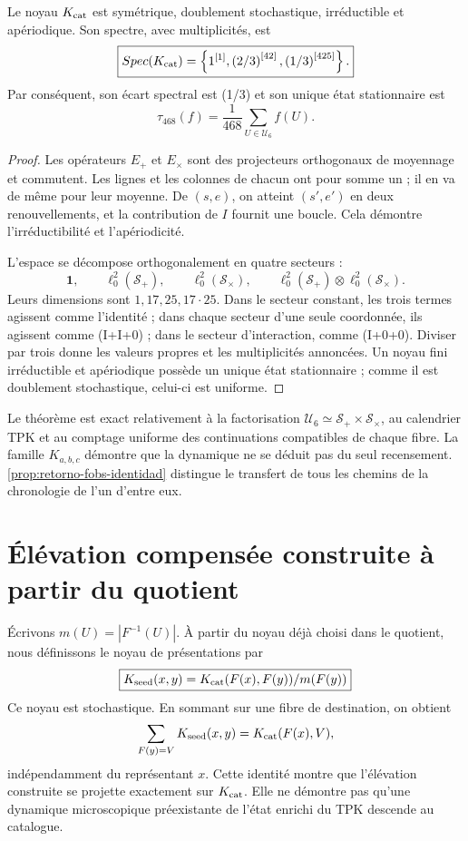 \begin{theorem}
\label{thm:dinamica-cociente-468}
Le noyau \(K_{\rm cat}\) est symétrique, doublement stochastique,
irréductible et apériodique. Son spectre, avec multiplicités, est
\[
 \boxed{
 \operatorname{Spec}(K_{\rm cat})
 =\left\{1^{[1]},
 \left(\frac23\right)^{[42]},
 \left(\frac13\right)^{[425]}\right\}.
 }
\]
Par conséquent, son écart spectral est (1/3) et son unique état
stationnaire est
\[
 \boxed{
 \tau_{468}(f)=\frac1{468}\sum_{U\in\mathcal U_6}f(U).
 }
\]
\end{theorem}

\begin{proof}
Les opérateurs \(E_+\) et \(E_\times\) sont des projecteurs orthogonaux de
moyennage et commutent. Les lignes et les colonnes de chacun ont pour somme un ; il en va de même
pour leur moyenne. De \((s,e)\), on atteint \((s',e')\) en deux
renouvellements, et la contribution de \(I\) fournit une boucle. Cela
démontre l'irréductibilité et l'apériodicité.

L'espace se décompose orthogonalement en quatre secteurs :
\[
 \mathbf1,
 \qquad
 \ell_0^2(\mathcal S_+),
 \qquad
 \ell_0^2(\mathcal S_\times),
 \qquad
 \ell_0^2(\mathcal S_+)\otimes
 \ell_0^2(\mathcal S_\times).
\]
Leurs dimensions sont \(1,17,25,17\cdot25\). Dans le secteur constant, les
trois termes agissent comme l'identité ; dans chaque secteur d'une seule coordonnée,
ils agissent comme (I+I+0) ; dans le secteur d'interaction, comme (I+0+0).
Diviser par trois donne les valeurs propres et les multiplicités annoncées. Un noyau
fini irréductible et apériodique possède un unique état stationnaire ; comme il est
doublement stochastique, celui-ci est uniforme.
\end{proof}

Le théorème est exact relativement à la factorisation
\(\mathcal U_6\simeq\mathcal S_+\times\mathcal S_\times\), au calendrier
TPK et au comptage uniforme des continuations compatibles de chaque fibre. La
famille \(K_{a,b,c}\) démontre que la dynamique ne se déduit pas du seul
recensement. \cref{prop:retorno-fobs-identidad} distingue le transfert de
tous les chemins de la chronologie de l'un d'entre eux.

\section{Élévation compensée construite à partir du quotient}

Écrivons \(m(U)=|F^{-1}(U)|\). À partir du noyau déjà choisi dans le quotient,
nous définissons le noyau de présentations par
\[
 \boxed{
 K_{\rm seed}(x,y)
 =\frac{K_{\rm cat}(F(x),F(y))}{m(F(y))}
 }
\]
Ce noyau est stochastique. En sommant sur une fibre de destination, on obtient
\[
 \sum_{F(y)=V}K_{\rm seed}(x,y)
 =K_{\rm cat}(F(x),V),
\]
indépendamment du représentant \(x\). Cette identité montre que
l'élévation construite se projette exactement sur \(K_{\rm cat}\). Elle ne démontre pas
qu'une dynamique microscopique préexistante de l'état enrichi du TPK descende
au catalogue.

